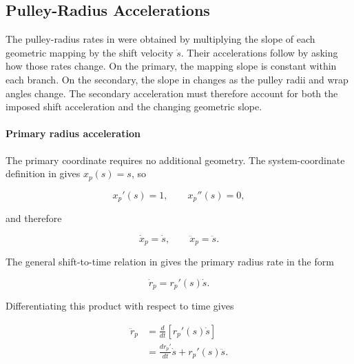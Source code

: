 \documentclass[11pt]{report}
\numberwithin{equation}{section}
\begin{document}
\subsection{Pulley-Radius Accelerations}
\label{sec:pulley_radius_accelerations}

The pulley-radius rates in
 were obtained by
multiplying the slope of each geometric mapping by the shift velocity
\(\dot s\). Their accelerations follow by asking how those rates change. On
the primary, the mapping slope is constant within each branch. On the
secondary, the slope in  changes as the
pulley radii and wrap angles change. The secondary acceleration must therefore
account for both the imposed shift acceleration and the changing geometric
slope.

\paragraph{Primary radius acceleration}

The primary coordinate requires no additional geometry. The system-coordinate
definition in  gives \(x_p(s)=s\), so

\begin{equation}
    x_p'(s)=1,
    \qquad
    x_p''(s)=0,
    \label{eq:primary_coordinate_derivatives}
\end{equation}

and therefore

\begin{equation}
    \dot x_p=\dot s,
    \qquad
    \ddot x_p=\ddot s.
    \label{eq:primary_axial_acceleration}
\end{equation}

The general shift-to-time relation in  gives the
primary radius rate in the form

\begin{equation}
    \dot r_p=r_p'(s)\dot s.
    \label{eq:primary_radius_rate_acceleration_start}
\end{equation}

Differentiating this product with respect to time gives

\begin{align}
    \ddot r_p
    &=
    \frac{d}{dt}
    \left[
        r_p'(s)\dot s
    \right]
    \nonumber\\
    &=
    \frac{d r_p'}{dt}\dot s
    +
    r_p'(s)\ddot s.
    \label{eq:primary_radius_acceleration_product_rule}
\end{align}
\end{document}
